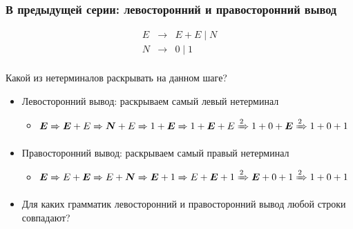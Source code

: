 \documentclass{beamer}
\newcommand{\derives}[1][*]{\xRightarrow[]{#1}}
\def\To{\derives[]}
\begin{document}
\begin{frame}[fragile]
  \transwipe[direction=90]
  \frametitle{В предыдущей серии: левосторонний и правосторонний вывод}
  
\[
  \begin{array}{rcl}
  E& \rightarrow & E + E \mid N \\
  N& \rightarrow & 0 \mid 1  \\
  \end{array}
\]
  

\begin{center}
    Какой из нетерминалов раскрывать на данном шаге? 
\end{center}
  
  \begin{itemize}
    \item Левосторонний вывод: раскрываем самый левый нетерминал
    \begin{itemize}
      \item $\boldsymbol{E} \To \boldsymbol{E} + E \To \boldsymbol{N} + E \To 1 + \boldsymbol{E} \To 1 + \boldsymbol{E} + E \derives[2] 1 + 0 + \boldsymbol{E} \derives[2] 1 + 0 + 1 $ \pause 
	\end{itemize} 
    \item Правосторонний вывод: раскрываем самый правый нетерминал
    \begin{itemize}
      \item $\boldsymbol{E} \To E + \boldsymbol{E} \To E + \boldsymbol{N} \To \boldsymbol{E} + 1 \To E + \boldsymbol{E} + 1 \derives[2] \boldsymbol{E} + 0 + 1 \derives[2] 1 + 0 + 1 $  
	\end{itemize}
	\pause
	\item Для каких грамматик левосторонний и правосторонний вывод любой строки совпадают? 	
  \end{itemize}
\end{frame}
\end{document}

